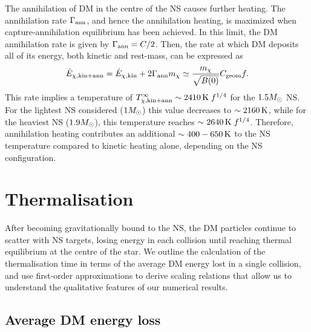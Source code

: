 The annihilation of DM in the centre of the NS causes further heating. The annihilation rate $\Gamma_{\rm ann}$, and hence the annihilation heating, is maximized when capture-annihilation equilibrium has been achieved. In this limit, the DM annihilation rate is given by $\Gamma_{\rm ann} = C/2$. Then, the rate at which DM deposits all of its energy, both kinetic and rest-mass, can be expressed as 
\begin{equation}
  \dot E_{\chi, \rm kin + ann} = \dot E_{\chi, \rm kin} + 2 \Gamma_{\rm ann} m_\chi \simeq \frac{m_\chi}{\sqrt{B(0)}} C_{\rm geom}f. \label{ch6:eq:massheating}
\end{equation} 
This rate implies a temperature of $T^\infty_{\chi,\rm kin+ann}  \sim  2410{\rm \,K}\;f^{1/4}$ for the $1.5M_\odot$ NS. For the lightest NS considered ($1M_\odot$) this value decreases to $\sim  2160{\rm \,K}$, while for the heaviest NS ($1.9M_\odot$), this temperature reaches $\sim  2640{\rm \,K}\;f^{1/4}$. Therefore, annihilation heating contributes an additional $\sim 400-650{\rm \,K}$ to the NS temperature compared to kinetic heating alone, depending on the NS configuration. 

  
\section{Thermalisation}
\label{ch6:sec:thermalisation}



After becoming gravitationally bound to the NS, the DM particles continue to scatter with NS targets, losing energy in each collision until reaching thermal equilibrium at the centre of the star. 
We outline the calculation of the thermalisation time in terms of the average DM energy lost in a single collision, and use first-order approximations to derive scaling relations that allow us to understand the qualitative features of our numerical results.


\subsection{Average DM energy loss}
\label{ch6:sec:energyloss}


